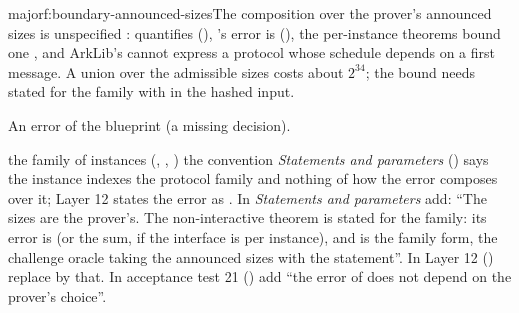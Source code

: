 \begin{finding}{major}{f:boundary-announced-sizes}{The composition over the prover's announced sizes is unspecified}
 :  quantifies
 (), 's error is 
(), the per-instance theorems bound one , and ArkLib's
 cannot express a protocol whose schedule depends on a first message. A union
over the admissible sizes costs about $2^{34}$; the  bound needs
 stated for the family with  in the hashed input.

 An error of the blueprint (a missing decision).

\begin{change}{the family of instances (, , )}
\asis the convention \emph{Statements and parameters} () says the instance indexes
the protocol family and nothing of how the error composes over it; Layer 12 states the error as
.
\asproposed In \emph{Statements and parameters} add: \enquote{The sizes are the prover's. The
non-interactive theorem is stated for the family: its error is
 (or the sum, if the interface is per
instance), and  is the family form, the challenge oracle taking the
announced sizes with the statement}. In Layer 12 () replace 
by that. In acceptance test 21 () add \enquote{the error of  does
not depend on the prover's choice}.
\end{change}
\end{finding}

